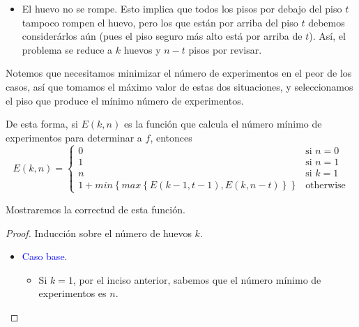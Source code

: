 \documentclass[letterpaper,11pt]{article}
\begin{document}
\begin{enumerate}
\begin{enumerate}
\begin{itemize}
\begin{proof}
\begin{itemize}
                    \item \textcolor{blue}{Hipótesis de inducción}. Supongamos 
                    que se cumple para $a$, es decir, supongamos que 
                    $E(a-1, t-1)$ tiene el número mínimo para encontrar el valor 
                    de $f$. 

                    \item \textcolor{blue}{Paso inductivo}. Queremos probar que 
                    se cumple para $a+1$. Por hipótesis de inducción sabemos que 
                    $E(a-1, t-1)$ tiene el número mínimo para encontrar 
                \end{itemize}
            \end{proof}

            \item El huevo no se rompe. Esto implica que todos los pisos 
            por debajo del piso $t$ tampoco rompen el huevo, pero los que están 
            por arriba del piso $t$ debemos considerárlos aún (pues el piso 
            seguro más alto está por arriba de $t$). Así, el problema se  
            reduce a $k$ huevos y $n-t$ pisos por revisar. 
        \end{itemize}

        Notemos que necesitamos minimizar el número de experimentos en el peor 
        de los casos, así que tomamos el máximo valor de estas dos situaciones, 
        y seleccionamos el piso que produce el mínimo número de experimentos.

        De esta forma, si $E(k,n)$ es la función que calcula el número mínimo 
        de experimentos para determinar a $f$, entonces 
        \begin{equation*}
            E(k, n) = 
            \begin{cases}
                0 & \text{si $n =0$} \\
                1 & \text{si $n = 1$} \\
                n & \text{si $k = 1$} \\
                1 + min\left\{max\left\{E(k-1, t-1), E(k, n-t)\right\}\right\} & 
                \text{otherwise}
            \end{cases}
        \end{equation*}
    \end{enumerate}

    Mostraremos la correctud de esta función.
    \begin{proof}
        Inducción sobre el número de huevos $k$.
        \begin{itemize}
            \item \textcolor{blue}{Caso base}.
            \begin{itemize}
                \item Si $k = 1$, por el inciso anterior, sabemos que el 
                número mínimo de experimentos es $n$. 
            \end{itemize}


\end{itemize}
\end{proof}
\end{enumerate}
\end{document}
